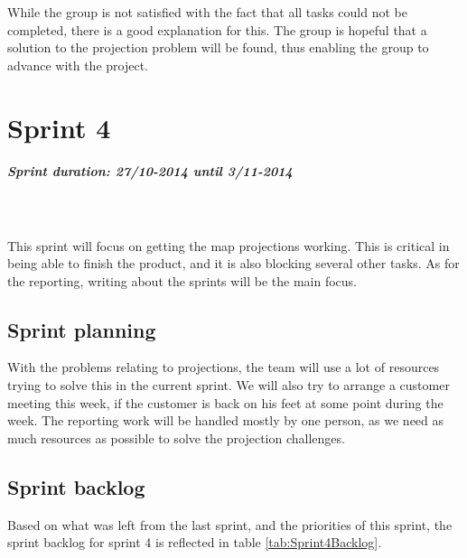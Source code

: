 \documentclass[11pt,a4paper,titlepage,oneside]{report}
\begin{document}
While the group is not satisfied with the fact that all tasks could not be completed, there is a good explanation for this. The group is hopeful that a solution to the projection problem will be found, thus enabling the group to advance with the project. 

\chapter{Sprint 4}
\paragraph{Sprint duration: 27/10-2014 until 3/11-2014} \hfill \\
\\
\noindent
This sprint will focus on getting the map projections working. This is critical in being able to finish the product, and it is also blocking several other tasks. As for the reporting, writing about the sprints will be the main focus. 

\section{Sprint planning}
With the problems relating to projections, the team will use a lot of resources trying to solve this in the current sprint. We will also try to arrange a customer meeting this week, if the customer is back on his feet at some point during the week. The reporting work will be handled mostly by one person, as we need as much resources as possible to solve the projection challenges. 
\section{Sprint backlog}
Based on what was left from the last sprint, and the priorities of this sprint, the sprint backlog for sprint 4 is reflected in table \ref{tab:Sprint4Backlog}.
\end{document}
